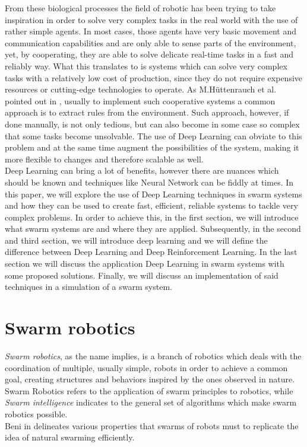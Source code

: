 \documentclass[conference]{IEEEtran}
\begin{document}
From these biological processes the field of robotic has been trying to take inspiration in order to solve very complex tasks in the real world with the use of rather simple agents. In most cases, those agents have very basic movement and communication capabilities and are only able to sense parts of the environment, yet, by cooperating, they are able to solve delicate real-time tasks in a fast and reliably way. What this translates to is systems which can solve very complex tasks with a relatively low cost of production, since they do not require expensive resources or cutting-edge technologies to operate. As M.H{\"u}ttenrauch et al. pointed out in \cite{guided}, usually to implement such cooperative systems a common approach is to extract rules from the environment. Such approach, however, if done manually, is not only tedious, but can also become in some case so complex that some tasks become unsolvable. The use of Deep Learning can obviate to this problem and at the same time augment the possibilities of the system, making it more flexible to changes and therefore scalable as well. \\Deep Learning can bring a lot of benefits, however there are nuances which should be known and techniques like Neural Network can be fiddly at times. In this paper, we will explore the use of Deep Learning techniques in swarm systems and how they can be used to create fast, efficient, reliable systems to tackle very complex problems. In order to achieve this, in the first section, we will introduce what swarm systems are and where they are applied. Subsequently, in the second and third section, we will introduce deep learning and we will define the difference between Deep Learning and Deep Reinforcement Learning. In the last section we will discuss the application Deep Learning in swarm systems with some proposed solutions. Finally, we will discuss an implementation of said techniques in a simulation of a swarm system. 
\section{Swarm robotics}\label{sec:swarm}
\textit{Swarm robotics}, as the name implies, is a branch of robotics which deals with the coordination of multiple, usually simple, robots in order to achieve a common goal, creating structures and behaviors inspired by the ones observed in nature\cite{cheraghi_past_2021}.
Swarm Robotics refers to the application of swarm principles to robotics, while \textit{Swarm intelligence} indicates to the general set of algorithms which make swarm robotics possible. \\
Beni in \cite{10.1007/978-3-540-30552-1_1} delineates various properties that swarms of robots must to replicate the idea of natural swarming efficiently. \\
\end{document}
